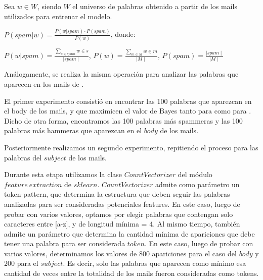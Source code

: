 Sea $w \in W$, siendo $W$ el universo de palabras obtenido a partir de los mails utilizados para entrenar el modelo.

\vspace{5px}
$P(spam \vert w) = \frac{P(w \vert spam) \cdot P(spam)}{P(w)}$, donde:

\vspace{5px}
$P(w \vert spam) = \frac{\sum_{s \in spam}^{} w \in s}{\mid spam \mid}$, $P(w) = \frac{\sum_{m \in M}^{} w \in m}{\mid M \mid}$, $P(spam) = \frac{\mid spam \mid}{\mid M \mid}$

\vspace{5px}
Análogamente, se realiza la misma operación para analizar las palabras que aparecen en los mails de \ham{}.

El primer experimento consistió en encontrar las 100 palabras que aparezcan en el body de los mails, y que maximicen el valor de Bayes tanto para \spam{} como
para \ham{}. Dicho de otra forma, encontramos las 100 palabras más spammeras y las 100 palabras más hammeras que aparezcan en el \(body\) de los mails.

Posteriormente realizamos un segundo experimento, repitiendo el proceso para las palabras del \(subject\) de los mails.

Durante esta etapa utilizamos la clase \(CountVectorizer\) del módulo \(feature \ extraction\) de \(sklearn\). \(CountVectorizer\) admite como parámetro un token-pattern,
que determina la estructura que deben seguir las palabras analizadas para ser consideradas potenciales features. En este caso, luego de probar con varios valores, optamos
por elegir palabras que contengan solo caracteres entre [a-z], y de longitud mínima = 4. Al mismo tiempo, también admite un parámetro que determina
la cantidad mínima de apariciones que debe tener una palabra para ser considerada \(token\). En este caso, luego de probar con varios valores, determinamos los valores de
800 apariciones para el caso del \(body\) y 200 para el \(subject\). Es decir, solo las palabras que aparecen como mínimo esa cantidad de veces entre la totalidad de
los mails fueron consideradas como tokens.
